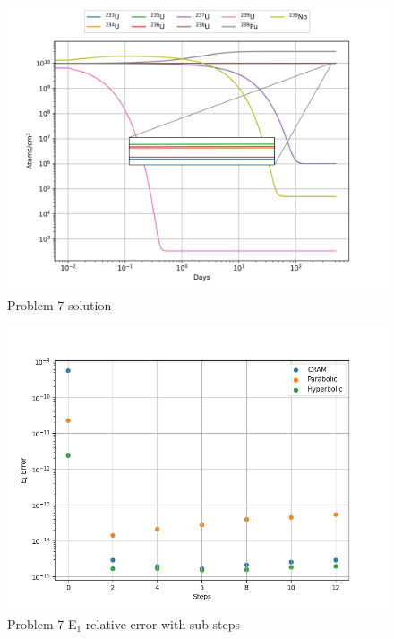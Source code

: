 \clearpage

\begin{figure}[p]
    \centering
    \includegraphics[width=6in]{images/chapter-5/progressionProblems/problem7/problem7soltution.png}
    \caption{Problem 7 solution}
    \label{fig:problem7_solution}
\end{figure}

\clearpage

\begin{figure}[p]
    \centering
    \includegraphics[width=6in]{images/chapter-5/progressionProblems/problem7/problem7E1ErrorWithSteps.png}
    \caption{Problem 7 E${}_{1}$ relative error with sub-steps}
    \label{fig:problem7_E1_error_with_steps}
\end{figure}

